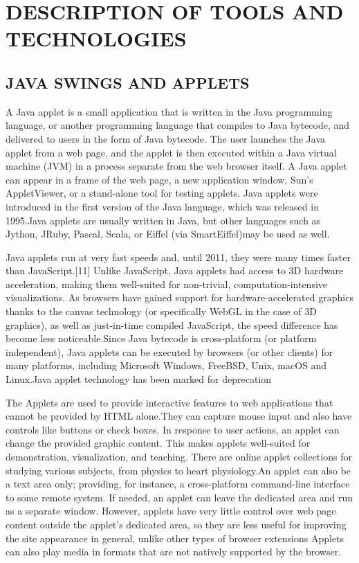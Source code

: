 \chapter{DESCRIPTION OF TOOLS AND TECHNOLOGIES}

\section{JAVA SWINGS AND APPLETS}
A Java applet is a small application that is written in the Java programming language, or another programming language that compiles to Java bytecode, and delivered to users in the form of Java bytecode. The user launches the Java applet from a web page, and the applet is then executed within a Java virtual machine (JVM) in a process separate from the web browser itself. A Java applet can appear in a frame of the web page, a new application window, Sun's AppletViewer, or a stand-alone tool for testing applets. Java applets were introduced in the first version of the Java language, which was released in 1995.Java applets are usually written in Java, but other languages such as Jython,  JRuby, Pascal, Scala, or Eiffel (via SmartEiffel)may be used as well.

Java applets run at very fast speeds and, until 2011, they were many times faster than JavaScript.[11] Unlike JavaScript, Java applets had access to 3D hardware acceleration, making them well-suited for non-trivial, computation-intensive visualizations. As browsers have gained support for hardware-accelerated graphics thanks to the canvas technology (or specifically WebGL in the case of 3D graphics), as well as just-in-time compiled JavaScript, the speed difference has become less noticeable.Since Java bytecode is cross-platform (or platform independent), Java applets can be executed by browsers (or other clients) for many platforms, including Microsoft Windows, FreeBSD, Unix, macOS and Linux.Java applet technology has been marked for deprecation

The Applets are used to provide interactive features to web applications that cannot be provided by HTML alone.They can capture mouse input and also have controls like buttons or check boxes. In response to user actions, an applet can change the provided graphic content. This makes applets well-suited for demonstration, visualization, and teaching. There are online applet collections for studying various subjects, from physics to heart physiology.An applet can also be a text area only; providing, for instance, a cross-platform command-line interface to some remote system. If needed, an applet can leave the dedicated area and run as a separate window. However, applets have very little control over web page content outside the applet's dedicated area, so they are less useful for improving the site appearance in general, unlike other types of browser extensions Applets can also play media in formats that are not natively supported by the browser. 

